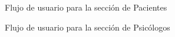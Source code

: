 \begin{figure}[H]
    \caption{Flujo de usuario para la sección de Pacientes}
    \label{flow-pacientes}
\end{figure}

\begin{figure}[H]
    \caption{Flujo de usuario para la sección de Psicólogos}
    \label{flow-psicologos}
\end{figure}

